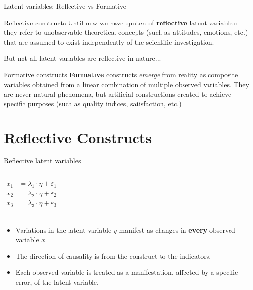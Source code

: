 \documentclass{beamer}
\begin{document}
\begin{frame}{Latent variables: Reflective vs Formative}
    \begin{block}{Reflective constructs}
        Until now we have spoken of \textbf{reflective} latent variables: they refer to unobservable theoretical concepts (such as attitudes, emotions, etc.) that are assumed to exist independently of the scientific investigation.
    \end{block}
    But not all latent variables are reflective in nature... \\
    \pause
    \begin{block}{Formative constructs}
        \textbf{Formative} constructs \textit{emerge} from reality as composite variables obtained from a linear combination of multiple observed variables. They are never natural phenomena, but artificial constructions created to achieve specific purposes (such as quality indices, satisfaction, etc.)
    \end{block}
\end{frame}

\section{Reflective Constructs}
\begin{frame}{Reflective latent variables}
    \begin{columns}
    \[
    \begin{aligned}
    x_1 &= \lambda_1 \cdot \eta + \varepsilon_1 \\
    x_2 &= \lambda_2 \cdot \eta + \varepsilon_2 \\
    x_3 &= \lambda_3 \cdot \eta + \varepsilon_3 \\
    \end{aligned}
    \]
    \end{columns}
    \vspace{1em}
    \pause
    \begin{itemize}
        \item Variations in the latent variable $\eta$ manifest as changes in \textbf{every} observed variable $x$.
        \item The direction of causality is from the construct to the indicators.
        \item Each observed variable is treated as a manifestation, affected by a specific error, of the latent variable.
    \end{itemize}
\end{frame}
\end{document}
